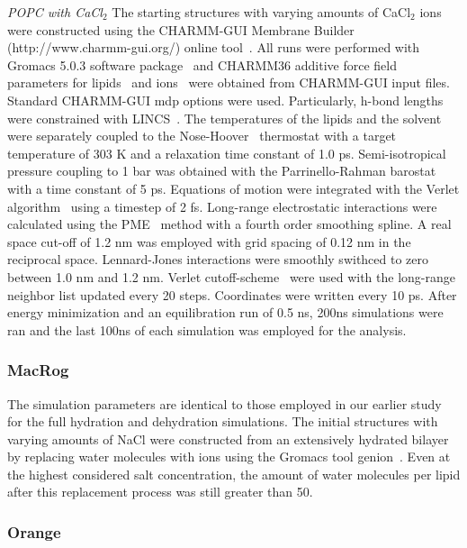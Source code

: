 \documentclass[pre,aps,floatfix,authordate1-4,twocolumn]{revtex4-1}
\begin{document}
{\it POPC with CaCl$_2$}
The starting structures with varying amounts of CaCl$_2$ ions were constructed using the CHARMM-GUI Membrane Builder (http://www.charmm-gui.org/) online tool~\cite{lee15}. 
All runs were performed with Gromacs 5.0.3 software package~\cite{abraham15} and CHARMM36 additive force field parameters for lipids~\cite{klauda10} and ions~\cite{??} were obtained from CHARMM-GUI input files. 
Standard CHARMM-GUI mdp options were used. Particularly, h-bond lengths were constrained with LINCS~\cite{hess97,hess07}. The temperatures of the 
lipids and the solvent were separately coupled to the Nose-Hoover~\cite{nose84,hoover85} thermostat with a target temperature of 303 K and a relaxation time constant of 1.0 ps. Semi-isotropical 
pressure coupling to 1 bar was obtained with the Parrinello-Rahman barostat~\cite{parrinello81} with a time constant of 5 ps. Equations of motion were integrated with the Verlet algorithm~\cite{pall13} 
using a timestep of 2 fs. Long-range electrostatic interactions were calculated using the PME~\cite{darden93,essman95} method with a fourth order smoothing spline. A real space cut-off of 1.2 nm 
was employed with grid spacing of 0.12 nm in the reciprocal space. Lennard-Jones interactions were smoothly swithced to zero between 1.0 nm and 1.2 nm. Verlet cutoff-scheme~\cite{pall13}  
were used with the long-range neighbor list updated every 20 steps. Coordinates were written every 10 ps.
After energy minimization and an equilibration run of 0.5 ns, 200ns simulations were ran and the last 100ns of each simulation was employed for the analysis.

\subsubsection{MacRog}
The simulation parameters are identical to those employed in our earlier study~\cite{botan15} for the full 
hydration and dehydration simulations. The initial structures with varying amounts of NaCl were constructed from an 
extensively hydrated bilayer by replacing water molecules with ions using the Gromacs tool genion~\cite{gromacsMANUAL}. Even at the highest 
considered salt concentration, the amount of water molecules per lipid after this replacement process was still greater than 50.

\subsubsection{Orange}
\end{document}
